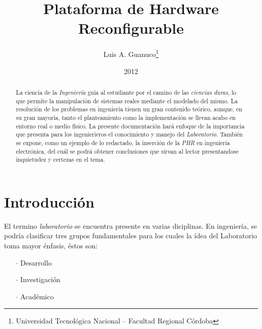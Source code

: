 \documentclass[a4paper]{article}
\author{Luis A. Guanuco\thanks{Universidad Tecnológica Nacional -- Facultad Regional Córdoba}}
\title{Plataforma de Hardware Reconfigurable}
\date{2012}
\begin{document}
\maketitle
\begin{abstract} 
  La ciencia de la \emph{Ingeniería} guía al estudiante por el camino de las \emph{ciencias duras}, lo que permite la manipulación de sistemas reales mediante el modelado del mismo. La resolución de los problemas en ingeniería tienen un gran contenido teórico, aunque, en su gran mayoría, tanto el planteamiento como la implementación se llevan acabo en entorno real o medio físico. La presente documentación hará enfoque de la importancia que presenta para los ingenierieros el conocimiento y manejo del \emph{Laboratorio}. También se expone, como un ejemplo de lo redactado, la inserción de la \emph{\ac{PHR}} en ingeniería electrónica, del cuál se podrá obtener conclusiones que sirvan al lector presentandose inquietudez y certezas en el tema.
\end{abstract}

\section{Introducción}
\label{sec:intro}
El termino \emph{laboratorio} se encuentra presente en varias diciplinas. En ingeniería, se podría clasificar tres grupos fundamentales para los cuales la ídea del Laboratorio toma mayor énfasis, éstos son:
\begin{itemize}
\item[$\cdot$] Desarrollo
\item[$\cdot$] Investigación
\item[$\cdot$] Académico
\end{itemize}
\end{document}
